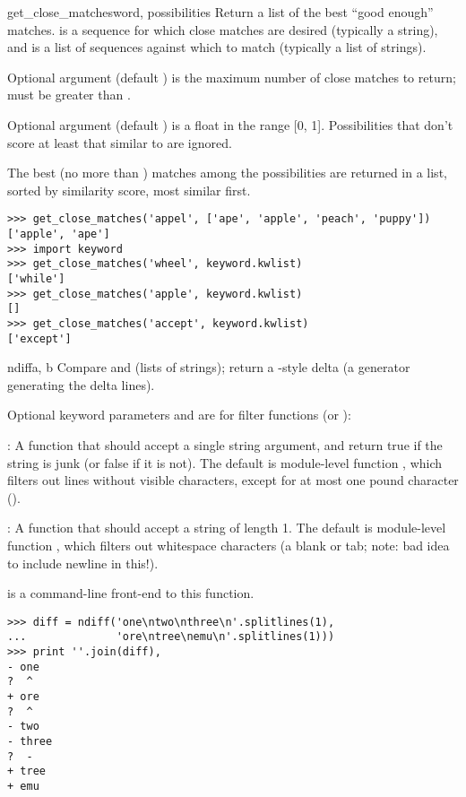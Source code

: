 \begin{funcdesc}{get_close_matches}{word, possibilities}
  Return a list of the best ``good enough'' matches.   is a
  sequence for which close matches are desired (typically a string),
  and  is a list of sequences against which to
  match  (typically a list of strings).

  Optional argument  (default ) is the maximum number
  of close matches to return;  must be greater than .

  Optional argument  (default ) is a float in
  the range [0, 1].  Possibilities that don't score at least that
  similar to  are ignored.

  The best (no more than ) matches among the possibilities are
  returned in a list, sorted by similarity score, most similar first.

\begin{verbatim}
>>> get_close_matches('appel', ['ape', 'apple', 'peach', 'puppy'])
['apple', 'ape']
>>> import keyword
>>> get_close_matches('wheel', keyword.kwlist)
['while']
>>> get_close_matches('apple', keyword.kwlist)
[]
>>> get_close_matches('accept', keyword.kwlist)
['except']
\end{verbatim}
\end{funcdesc}

\begin{funcdesc}{ndiff}{a, b}
  Compare  and  (lists of strings); return a
  -style delta (a generator generating the delta lines).

  Optional keyword parameters  and  are
  for filter functions (or ):

  : A function that should accept a single string
  argument, and return true if the string is junk (or false if it is
  not). The default is module-level function
  , which filters out lines without visible
  characters, except for at most one pound character (\character{\#}).

  : A function that should accept a string of length 1.
  The default is module-level function ,
  which filters out whitespace characters (a blank or tab; note: bad
  idea to include newline in this!).

   is a command-line front-end to this
  function.

\begin{verbatim}
>>> diff = ndiff('one\ntwo\nthree\n'.splitlines(1),
...              'ore\ntree\nemu\n'.splitlines(1)))
>>> print ''.join(diff),
- one
?  ^
+ ore
?  ^
- two
- three
?  -
+ tree
+ emu
\end{verbatim}
\end{funcdesc}

